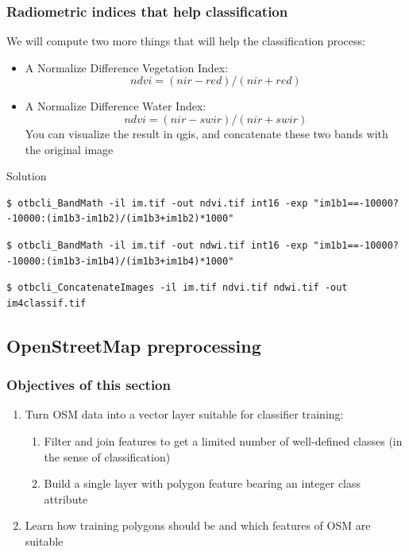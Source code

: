 \documentclass[8pt]{beamer}
\begin{document}
\begin{frame}[fragile]
\frametitle{Radiometric indices that help classification}

We will compute two more things that will help the classification process:
\begin{itemize}
\item A Normalize Difference Vegetation Index:
\begin{equation}
ndvi = (nir-red)/(nir+red)
\end{equation}
\item A Normalize Difference Water Index:
\begin{equation}
ndvi = (nir-swir)/(nir+swir)
\end{equation}
You can visualize the result in qgis, and concatenate these two bands with the original image
\end{itemize}

\begin{block}{Solution}
\begin{scriptsize}
\begin{verbatim}
$ otbcli_BandMath -il im.tif -out ndvi.tif int16 -exp "im1b1==-10000?-10000:(im1b3-im1b2)/(im1b3+im1b2)*1000"
\end{verbatim}
\end{scriptsize}
\begin{scriptsize}
\begin{verbatim}
$ otbcli_BandMath -il im.tif -out ndwi.tif int16 -exp "im1b1==-10000?-10000:(im1b3-im1b4)/(im1b3+im1b4)*1000"
\end{verbatim}
\end{scriptsize}
\begin{scriptsize}
\begin{verbatim}
$ otbcli_ConcatenateImages -il im.tif ndvi.tif ndwi.tif -out im4classif.tif
\end{verbatim}
\end{scriptsize}
\end{block}
\end{frame}

\subsection{OpenStreetMap preprocessing}

\begin{frame}
\frametitle{Objectives of this section}

\begin{enumerate}
\item Turn OSM data into a vector layer suitable for classifier training:
\begin{enumerate}
\item Filter and join features to get a limited number of well-defined classes (in the sense of classification)
\item Build a single layer with polygon feature bearing an integer class attribute
\end{enumerate}
\item Learn how training polygons should be and which features of OSM are suitable
\end{enumerate}

\end{frame}
\end{document}
